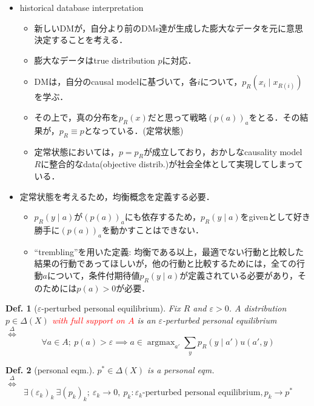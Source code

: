 \documentclass[11pt,a4paper,dvipdfmx]{article}
\theoremstyle{plain}
\newtheorem{df}{Def.}[section]
\renewcommand{\epsilon}{\varepsilon}
\newcommand{\defi}{\stackrel{\Delta}{\Longleftrightarrow}}
\DeclareMathOperator*{\argmax}{argmax}
\newcommand{\ocomment}[1]{{\textcolor{red}{#1}}}
\begin{document}
\newpage
\begin{itemize}
	\item historical database interpretation
	\begin{itemize}
		\item 新しいDMが，自分より前のDMs達が生成した膨大なデータを元に意思決定することを考える．
		\item 膨大なデータはtrue distribution $p$に対応．
		\item DMは，自分のcausal modelに基づいて，各$i$について，$p_R(x_i \mid x_{R(i)})$を学ぶ．
		\item その上で，真の分布を$p_R(x)$だと思って戦略$(p(a))_a$をとる．その結果が，$p_R \equiv p$となっている．(定常状態)
		\item 定常状態においては，$p = p_R$が成立しており，おかしなcausality model $R$に整合的なdata(objective distrib.)が社会全体として実現してしまっている．		
	\end{itemize}
	\item 定常状態を考えるため，均衡概念を定義する必要．
		\begin{itemize}
			\item $p_R(y \mid a)$が$(p(a))_a$にも依存するため，$p_R(y \mid a)$をgivenとして好き勝手に$(p(a))_a$を動かすことはできない．
			\item ``trembling''を用いた定義: 均衡である以上，最適でない行動と比較した結果の行動であってほしいが，他の行動と比較するためには，全ての行動$a$について，条件付期待値$p_R(y \mid a)$が定義されている必要があり，そのためには$p(a) > 0$が必要．
		\end{itemize}
\end{itemize}

\begin{screen}
\begin{df}[$\epsilon$-perturbed personal equilibrium]
	Fix $R$ and $\epsilon > 0$. A distribution $p \in \Delta(X)$ \ocomment{with full support on $A$} is an $\epsilon$-perturbed personal equilibrium \\
	$\defi$
	$$\forall a \in A; \  p(a) > \epsilon \implies a \in \argmax_{a'} \sum_y p_R(y \mid a') u(a', y)$$
\end{df}

\begin{df}[personal eqm.]
	$p^* \in \Delta(X)$ is a personal eqm. \\
	$\defi$ 
	$$
	\exists (\epsilon_k)_k \ \exists (p_k)_k; \  \epsilon_k \to 0, \ p_k: \text{$\epsilon_k$-perturbed personal equilibrium}, p_k \to p^*
	$$
\end{df}
\end{screen}
\end{document}
